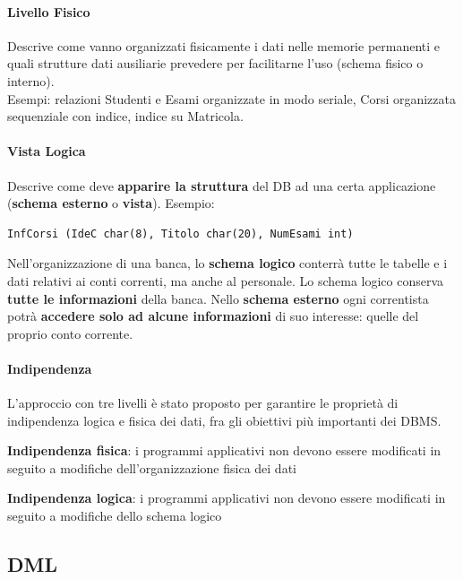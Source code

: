 \documentclass[10pt]{book}
\begin{document}
\paragraph{Livello Fisico} Descrive come vanno organizzati fisicamente i dati nelle memorie permanenti e quali strutture dati ausiliarie prevedere per facilitarne l'uso (schema fisico o interno).\\
Esempi: relazioni Studenti e Esami organizzate in modo seriale, Corsi organizzata sequenziale con indice, indice su Matricola.
\paragraph{Vista Logica} Descrive come deve \textbf{apparire la struttura} del DB ad una certa applicazione (\textbf{schema esterno} o \textbf{vista}). Esempio:
\begin{lstlisting}
InfCorsi (IdeC char(8), Titolo char(20), NumEsami int)
\end{lstlisting}
Nell'organizzazione di una banca, lo \textbf{schema logico} conterrà tutte le tabelle e i dati relativi ai conti correnti, ma anche al personale. Lo schema logico conserva \textbf{tutte le informazioni} della banca. Nello \textbf{schema esterno} ogni correntista potrà \textbf{accedere solo ad alcune informazioni} di suo interesse: quelle del proprio conto corrente.
\paragraph{Indipendenza} L'approccio con tre livelli è stato proposto per garantire le proprietà di indipendenza logica e fisica dei dati, fra gli obiettivi più importanti dei DBMS.
\begin{list}{}{}
	\item \textbf{Indipendenza fisica}: i programmi applicativi non devono essere modificati in seguito a modifiche dell'organizzazione fisica dei dati
	\item \textbf{Indipendenza logica}: i programmi applicativi non devono essere modificati in seguito a modifiche dello schema logico
\end{list}
\subsection{DML}
\end{document}
